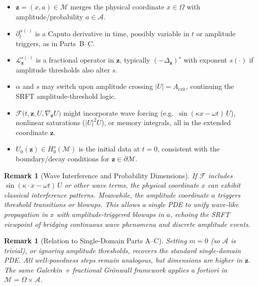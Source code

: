 \documentclass[12pt]{article}
\newtheorem{remark}[theorem]{Remark}
\begin{document}
\begin{itemize}
\item $\mathbf{z} = (x,a)\in\mathcal{M}$ merges the physical coordinate $x\in\Omega$ 
      with amplitude/probability $a\in \mathcal{A}$. 
\item $\partial_t^{\alpha(\cdot)}$ is a Caputo derivative in time, possibly variable in $t$ 
      or amplitude triggers, as in Parts~B--C.
\item $\mathcal{L}_{\mathbf{z}}^{s(\cdot)}$ is a fractional operator in $\mathbf{z}$, 
      typically $( -\Delta_{\mathbf{z}} )^s$ with exponent $s(\cdot)$ if amplitude 
      thresholds also alter $s$.
\item $\alpha$ and $s$ may switch upon amplitude crossing $|U|=A_{\mathrm{crit}}$, 
      continuing the SRFT amplitude-threshold logic.  
\item $\mathcal{F}\bigl(t,\mathbf{z},U,\nabla_{\mathbf{z}}U\bigr)$ might incorporate 
      wave forcing (e.g.\ $\sin(\kappa x-\omega t)\,U$), nonlinear saturations ($|U|^2 U$), 
      or memory integrals, all in the extended coordinate $\mathbf{z}$.
\item $U_0(\mathbf{z})\in H_0^s(\mathcal{M})$ is the initial data at $t=0$, consistent 
      with the boundary/decay conditions for $\mathbf{z}\in\partial\mathcal{M}$.
\end{itemize}


\begin{remark}[Wave Interference and Probability Dimensions]
If $\mathcal{F}$ includes $\sin(\kappa \cdot x-\omega t)\,U$ or other wave terms, 
the physical coordinate $x$ can exhibit classical interference patterns. Meanwhile, 
the amplitude coordinate $a$ triggers threshold transitions or blowups. This allows 
a \emph{single PDE} to unify wave-like propagation in $x$ with amplitude-triggered 
blowups in $a$, echoing the SRFT viewpoint of bridging continuous wave phenomena 
and discrete amplitude events.
\end{remark}

\begin{remark}[Relation to Single-Domain Parts A--C]
Setting $m=0$ (so $\mathcal{A}$ is trivial), or ignoring amplitude thresholds, recovers 
the standard single-domain PDE. All well-posedness steps remain analogous, but 
\emph{dimensions} are higher in $\mathbf{z}$. The same Galerkin + fractional Grönwall 
framework applies \emph{a fortiori} in $\mathcal{M}=\Omega\times\mathcal{A}$.
\end{remark}
\end{document}
